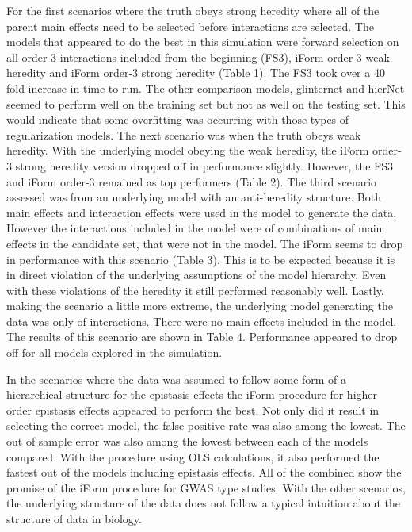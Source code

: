 \documentclass[11pt,]{book}
\theoremstyle{definition}
\theoremstyle{definition}
\theoremstyle{remark}
\begin{document}
For the first scenarios where the truth obeys strong heredity where all
of the parent main effects need to be selected before interactions are
selected. The models that appeared to do the best in this simulation
were forward selection on all order-3 interactions included from the
beginning (FS3), iForm order-3 weak heredity and iForm order-3 strong
heredity (Table 1). The FS3 took over a 40 fold increase in time to run.
The other comparison models, glinternet and hierNet seemed to perform
well on the training set but not as well on the testing set. This would
indicate that some overfitting was occurring with those types of
regularization models. The next scenario was when the truth obeys weak
heredity. With the underlying model obeying the weak heredity, the iForm
order-3 strong heredity version dropped off in performance slightly.
However, the FS3 and iForm order-3 remained as top performers (Table 2).
The third scenario assessed was from an underlying model with an
anti-heredity structure. Both main effects and interaction effects were
used in the model to generate the data. However the interactions
included in the model were of combinations of main effects in the
candidate set, that were not in the model. The iForm seems to drop in
performance with this scenario (Table 3). This is to be expected because
it is in direct violation of the underlying assumptions of the model
hierarchy. Even with these violations of the heredity it still performed
reasonably well. Lastly, making the scenario a little more extreme, the
underlying model generating the data was only of interactions. There
were no main effects included in the model. The results of this scenario
are shown in Table 4. Performance appeared to drop off for all models
explored in the simulation.

In the scenarios where the data was assumed to follow some form of a
hierarchical structure for the epistasis effects the iForm procedure for
higher-order epistasis effects appeared to perform the best. Not only
did it result in selecting the correct model, the false positive rate
was also among the lowest. The out of sample error was also among the
lowest between each of the models compared. With the procedure using OLS
calculations, it also performed the fastest out of the models including
epistasis effects. All of the combined show the promise of the iForm
procedure for GWAS type studies. With the other scenarios, the
underlying structure of the data does not follow a typical intuition
about the structure of data in biology.
\end{document}
